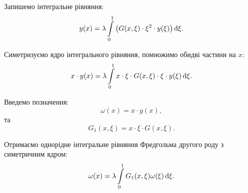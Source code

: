 \begin{solution}
	Запишемо інтегральне рівняння:
	\begin{equation*}
		y(x) = \lambda \displaystyle\int\limits_0^1 \left(G(x,\xi)\cdot\xi^2\cdot y(\xi)\right)\mathop{}\!\mathrm{d}\xi.
	\end{equation*}

	Симетризуємо ядро інтегрального рівняння, помножимо обидві частини на $x$:
	\begin{equation*}
		x \cdot y(x) = \lambda \displaystyle\int\limits_0^1 x \cdot \xi \cdot G(x, \xi) \cdot \xi \cdot y(\xi) \mathop{}\!\mathrm{d} \xi.
	\end{equation*}

	Введемо позначення:
	\begin{equation*}
		\omega(x) = x \cdot y(x),
	\end{equation*}
	та
	\begin{equation*}
		G_1(x, \xi) = x \cdot \xi \cdot G(x,\xi).
	\end{equation*}

	Отримаємо однорідне інтегральне рівняння Фредгольма другого роду з симетричним ядром:
	\begin{equation*}
		\omega(x) = \lambda \displaystyle\int\limits_0^1 G_1(x, \xi) \omega(\xi) \mathop{}\!\mathrm{d} \xi.
	\end{equation*}
\end{solution}

\newpage

